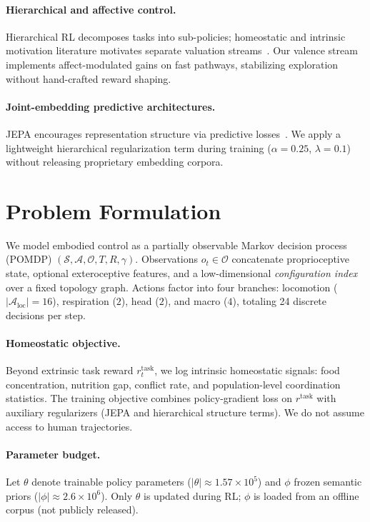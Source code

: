 \documentclass[11pt,a4paper]{article}
\begin{document}
\paragraph{Hierarchical and affective control.}
Hierarchical RL decomposes tasks into sub-policies; homeostatic and intrinsic motivation literature motivates separate valuation streams~\cite{makoviychuk2021isaac}. Our valence stream implements affect-modulated gains on fast pathways, stabilizing exploration without hand-crafted reward shaping.

\paragraph{Joint-embedding predictive architectures.}
JEPA encourages representation structure via predictive losses~\cite{lecun2022jepa}. We apply a lightweight hierarchical regularization term during training ($\alpha{=}0.25$, $\lambda{=}0.1$) without releasing proprietary embedding corpora.

\section{Problem Formulation}
\label{sec:problem}

We model embodied control as a partially observable Markov decision process (POMDP) $(\mathcal{S}, \mathcal{A}, \mathcal{O}, T, R, \gamma)$. Observations $o_t \in \mathcal{O}$ concatenate proprioceptive state, optional exteroceptive features, and a low-dimensional \emph{configuration index} over a fixed topology graph. Actions factor into four branches: locomotion ($|\mathcal{A}_{\mathrm{loc}}|{=}16$), respiration ($2$), head ($2$), and macro ($4$), totaling 24 discrete decisions per step.

\paragraph{Homeostatic objective.}
Beyond extrinsic task reward $r^{\mathrm{task}}_t$, we log intrinsic homeostatic signals: food concentration, nutrition gap, conflict rate, and population-level coordination statistics. The training objective combines policy-gradient loss on $r^{\mathrm{task}}$ with auxiliary regularizers (JEPA and hierarchical structure terms). We do not assume access to human trajectories.

\paragraph{Parameter budget.}
Let $\theta$ denote trainable policy parameters ($|\theta|{\approx}1.57{\times}10^5$) and $\phi$ frozen semantic priors ($|\phi|{\approx}2.6{\times}10^6$). Only $\theta$ is updated during RL; $\phi$ is loaded from an offline corpus (not publicly released).
\end{document}
